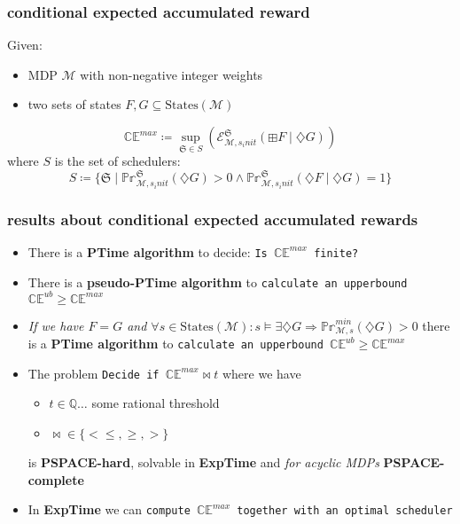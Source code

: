 \documentclass[onlymath]{beamer}
\begin{document}
\begin{frame}
	\frametitle{conditional expected accumulated reward}
	Given:
	\begin{itemize}
		\item MDP $\mathcal{M}$ with non-negative integer weights
		\item two sets of states $F, G \subseteq \mathrm{States}(\mathcal{M})$
	\end{itemize}
	\begin{definition}
		\[
		\mathbb{CE}^{max} \coloneqq \sup_{\mathfrak{S} \in S}(\mathcal{E}_{\mathcal{M}, s_init}^{\mathfrak{S}}(\boxplus F \mid \diamondsuit G))
		\]
		where $S$ is the set of schedulers: %
		\[
		S \coloneqq \{\mathfrak{S} \mid \mathbb{Pr}_{\mathcal{M},s_init}^{\mathfrak{S}}(\diamondsuit G) > 0 \land \mathbb{Pr}_{\mathcal{M},s_init}^{\mathfrak{S}}(\diamondsuit F \mid \diamondsuit G) = 1\}
		\]
		
	\end{definition}
	
\end{frame}

\begin{frame}
\frametitle{results about conditional expected accumulated rewards}
\begin{itemize}
	\item There is a \textbf{PTime algorithm} to decide: \texttt{Is $\mathbb{CE}^{max}$ finite?}
	\item There is a \textbf{pseudo-PTime algorithm} to \texttt{calculate an upperbound $\mathbb{CE}^{ub} \geq \mathbb{CE}^{max}$}
	\item \textit{If we have $F=G$ and $\forall s \in \mathrm{States}(\mathcal{M}): s \vDash \exists \diamondsuit G \Rightarrow \mathbb{Pr}_{\mathcal{M},s}^{min}(\diamondsuit G) > 0$ } there is a \textbf{PTime algorithm} to \texttt{calculate an upperbound $\mathbb{CE}^{ub} \geq \mathbb{CE}^{max}$}
	\item The problem \texttt{Decide if $\mathbb{CE}^{max} \bowtie t$} where we have
	\begin{itemize}
		\item $t\in \mathbb{Q}\dots$ some rational threshold
		\item $\bowtie \in \{<\leq,\geq,>\}$
	\end{itemize} is \textbf{PSPACE-hard}, solvable in \textbf{ExpTime} and \textit{for acyclic MDPs} \textbf{PSPACE-complete}
	\item In \textbf{ExpTime} we can \texttt{compute $\mathbb{CE}^{max}$ together with an optimal scheduler}
\end{itemize}

\end{frame}
\end{document}
